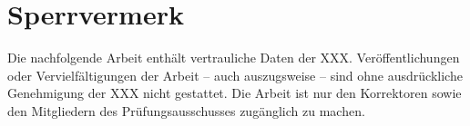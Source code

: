 \section*{Sperrvermerk}

Die nachfolgende Arbeit enthält vertrauliche Daten der XXX. Veröffentlichungen oder Vervielfältigungen der Arbeit – auch auszugsweise – sind ohne ausdrückliche Genehmigung der XXX nicht gestattet. Die Arbeit ist nur den Korrektoren sowie den Mitgliedern des Prüfungsausschusses zugänglich zu machen.
